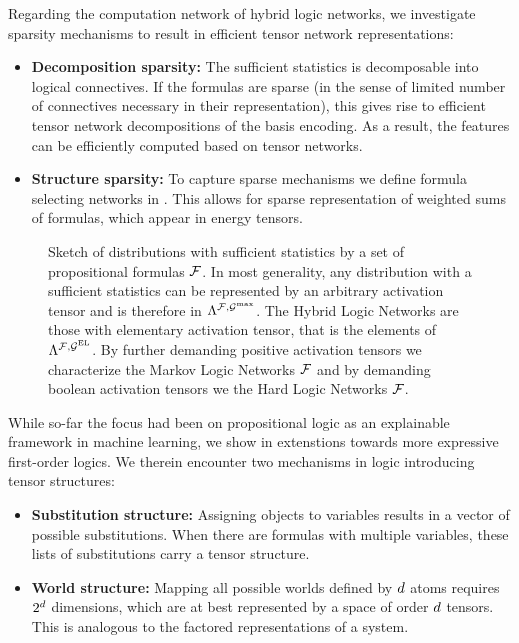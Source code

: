 Regarding the computation network of hybrid logic networks, we investigate sparsity mechanisms to result in efficient tensor network representations:
\begin{itemize}
	\item \textbf{Decomposition sparsity:} The sufficient statistics is decomposable into logical connectives.
	If the formulas are sparse (in the sense of limited number of connectives necessary in their representation), this gives rise to efficient tensor network decompositions of the basis encoding.
    As a result, the features can be efficiently computed based on tensor networks.
    \item \textbf{Structure sparsity:} To capture sparse mechanisms we define formula selecting networks in .
    This allows for sparse representation of weighted sums of formulas, which appear in energy tensors.
\end{itemize}

\begin{figure}[t]
    \begin{center}
        
    \end{center}
    \caption{Sketch of distributions with sufficient statistics by a set of propositional formulas $\mathcal{F}$.
    In most generality, any distribution with a sufficient statistics can be represented by an arbitrary activation tensor and is therefore in $\Lambda^{\mathcal{F},\mathcal{G}^{\mathrm{max}}}$.
    The Hybrid Logic Networks are those with elementary activation tensor, that is the elements of $\Lambda^{\mathcal{F},\mathcal{G}^{\mathrm{EL}}}$.
    By further demanding positive activation tensors we characterize the Markov Logic Networks $\mathcal{F}$ and by demanding boolean activation tensors we the Hard Logic Networks $\mathcal{F}$.
    }
    \label{fig:elementaryComputableSketch}
\end{figure}


While so-far the focus had been on propositional logic as an explainable framework in machine learning, we show in  extenstions towards more expressive first-order logics.
We therein encounter two mechanisms in logic introducing tensor structures:
\begin{itemize}
    \item \textbf{Substitution structure:} Assigning objects to variables results in a vector of possible substitutions. When there are formulas with multiple variables, these lists of substitutions carry a tensor structure.
    \item \textbf{World structure:} Mapping all possible worlds defined by $d$ atoms requires $2^{d}$ dimensions, which are at best represented by a space of order $d$ tensors.
    This is analogous to the factored representations of a system.
\end{itemize}

